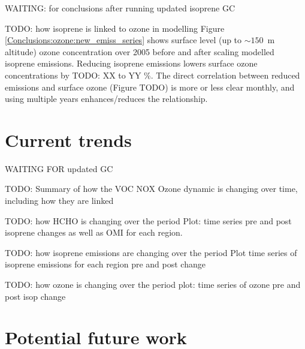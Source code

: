   WAITING: for conclusions after running updated isoprene GC
  
  TODO: how isoprene is linked to ozone in modelling 
  Figure \ref{Conclusions:ozone:new_emiss_series} shows surface level (up to $\sim 150$~m altitude) ozone concentration over 2005 before and after scaling modelled isoprene emissions.
  Reducing isoprene emissions lowers surface ozone concentrations by TODO: XX to YY \%.
  The direct correlation between reduced emissions and surface ozone (Figure TODO) is more or less clear monthly, and using multiple years enhances/reduces the relationship.
  
  
\section{Current trends}
\label{Conclusions:trends}
  
  WAITING FOR updated GC
  
  TODO: Summary of how the VOC NOX Ozone dynamic is changing over time, including how they are linked
  
  TODO: how HCHO is changing over the period
  Plot: time series pre and post isoprene changes as well as OMI for each region.

  TODO: how isoprene emissions are changing over the period
  Plot time series of isoprene emissions for each region pre and post change
  
  
  TODO: how ozone is changing over the period
  plot: time series of ozone pre and post isop change
  
\section{Potential future work}
\label{Conclusions:future}
  

